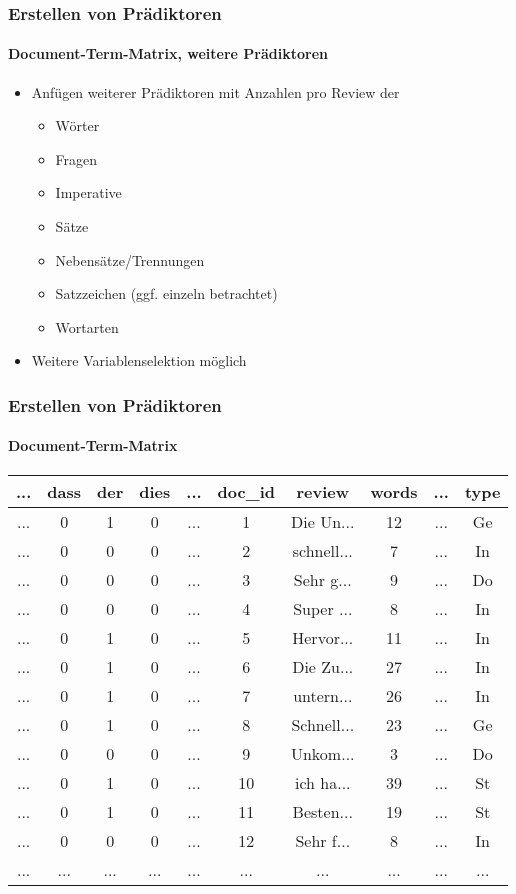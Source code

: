 \begin{frame}
\frametitle{Erstellen von Prädiktoren}
\framesubtitle{Document-Term-Matrix, weitere Prädiktoren}
\begin{itemize}\itemsep12pt
\item Anfügen weiterer Prädiktoren mit Anzahlen pro Review der
\begin{itemize}
\item Wörter %
\item Fragen %
\item Imperative %
\item Sätze %
\item Nebensätze/Trennungen %
\item Satzzeichen %
(ggf. einzeln betrachtet)
\item Wortarten %
\end{itemize} 
\item Weitere Variablenselektion möglich

\end{itemize}
\end{frame}

\begin{frame}
\frametitle{Erstellen von Prädiktoren}
\framesubtitle{Document-Term-Matrix}
\vspace{12pt}
\begin{tabular}{|c|c|c|c|c|c|c|c|c|c|}
\hline
...	&dass&  der 	& dies & ... & doc\_id	& review & words & ...& type\\
\hline
... &0& 1		& 0		&	...	& 1		& Die Un...&12 			& ...& Ge\\
...	& 0&0		& 0		&	...	& 2		& schnell...&7 			& ...& In\\
...	& 0&0		& 0		&	...	& 3		& Sehr g...&9 			& ...& Do\\
...	& 0&0		& 0		&	...	& 4		& Super ...&8 			& ...& In\\
...	& 0&1		& 0		&	...	& 5		& Hervor...&11 			& ...& In\\
...	& 0&1		& 0		&	...& 6		& Die Zu...&27 			& ...& In\\
...	& 0&1		& 0		&	...& 7		& untern...&26 			& ...& In\\
...	& 0&1		& 0		&	...& 8		& Schnell...&23 			& ...& Ge\\
...	& 0&0		& 0		&	...& 9		& Unkom...&3 			& ...& Do\\
...	& 0&1		& 0		&	...& 10	& ich ha...&39 			& ...& St\\
...	& 0&1		& 0		&	...	& 11	& Besten...&19 			& ...& St\\
...	& 0&0		& 0		&...	& 12	& Sehr f...&8 			& ...& In\\
...	& ...&...	&...	&	...	& ...  	& ...		&... 			& ...& ...\\
\hline
\end{tabular}


\end{frame}
